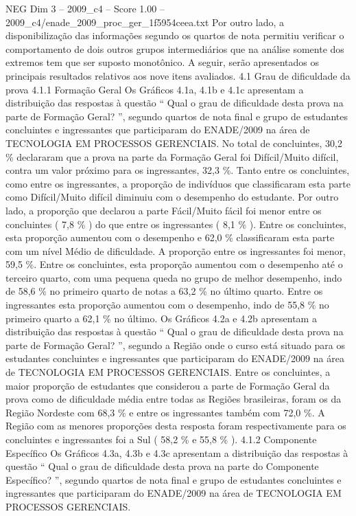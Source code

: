 \begin{textsample}{NEG Dim 3 – 2009\_c4 – Score 1.00 – 2009\_c4/enade\_2009\_proc\_ger\_1f5954ceea.txt}
Por outro lado, a disponibilização das informações segundo os quartos de nota permitiu verificar o comportamento de dois outros grupos intermediários que na análise somente dos extremos tem que ser suposto monotônico.
A seguir, serão apresentados os principais resultados relativos aos nove itens avaliados. 4.1 Grau de dificuldade da prova 4.1.1 Formação Geral Os Gráficos 4.1a, 4.1b e 4.1c apresentam a distribuição das respostas à questão “ Qual o grau de dificuldade desta prova na parte de Formação Geral? ”, segundo quartos de nota final e grupo de estudantes concluintes e ingressantes que participaram do ENADE/2009 na área de TECNOLOGIA EM PROCESSOS GERENCIAIS.
No total de concluintes, 30,2 \% declararam que a prova na parte da Formação Geral foi Difícil/Muito difícil, contra um valor próximo para os ingressantes, 32,3 \%.
Tanto entre os concluintes, como entre os ingressantes, a proporção de indivíduos que classificaram esta parte como Difícil/Muito difícil diminuiu com o desempenho do estudante.
Por outro lado, a proporção que declarou a parte Fácil/Muito fácil foi menor entre os concluintes ( 7,8 \% ) do que entre os ingressantes ( 8,1 \% ).
Entre os concluintes, esta proporção aumentou com o desempenho e 62,0 \% classificaram esta parte com um nível Médio de dificuldade.
A proporção entre os ingressantes foi menor, 59,5 \%.
Entre os concluintes, esta proporção aumentou com o desempenho até o terceiro quarto, com uma pequena queda no grupo de melhor desempenho, indo de 58,6 \% no primeiro quarto de notas a 63,2 \% no último quarto.
Entre os ingressantes esta proporção aumentou com o desempenho, indo de 55,8 \% no primeiro quarto a 62,1 \% no último.
Os Gráficos 4.2a e 4.2b apresentam a distribuição das respostas à questão “ Qual o grau de dificuldade desta prova na parte de Formação Geral? ”, segundo a Região onde o curso está situado para os estudantes concluintes e ingressantes que participaram do ENADE/2009 na área de TECNOLOGIA EM PROCESSOS GERENCIAIS.
Entre os concluintes, a maior proporção de estudantes que considerou a parte de Formação Geral da prova como de dificuldade média entre todas as Regiões brasileiras, foram os da Região Nordeste com 68,3 \% e entre os ingressantes também com 72,0 \%.
A Região com as menores proporções desta resposta foram respectivamente para os concluintes e ingressantes foi a Sul ( 58,2 \% e 55,8 \% ). 4.1.2 Componente Específico Os Gráficos 4.3a, 4.3b e 4.3c apresentam a distribuição das respostas à questão “ Qual o grau de dificuldade desta prova na parte do Componente Específico? ”, segundo quartos de nota final e grupo de estudantes concluintes e ingressantes que participaram do ENADE/2009 na área de TECNOLOGIA EM PROCESSOS GERENCIAIS.

\end{textsample}
